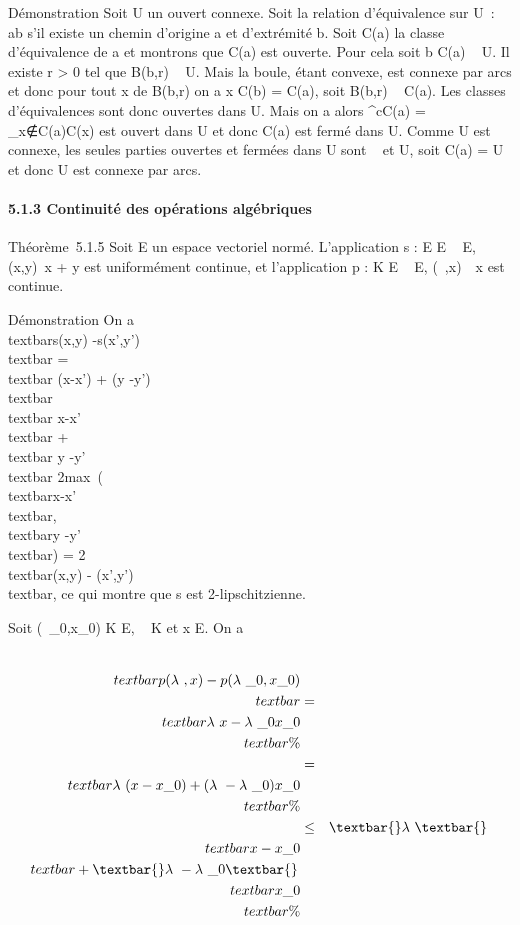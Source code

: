 \documentclass[]{article}
\begin{document}
Démonstration Soit U un ouvert connexe. Soit  la relation d'équivalence
sur U~: ab s'il existe un chemin d'origine a et d'extrémité b. Soit
C(a) la classe d'équivalence de a et montrons que C(a) est ouverte. Pour
cela soit b \in C(a) \subset~ U. Il existe r \textgreater{} 0 tel que B(b,r) \subset~ U.
Mais la boule, étant convexe, est connexe par arcs et donc pour tout x
de B(b,r) on a x \in C(b) = C(a), soit B(b,r) \subset~ C(a). Les classes
d'équivalences sont donc ouvertes dans U. Mais on a alors
^cC(a) =\ \⋃
 \_x∉C(a)C(x) est ouvert dans U et
donc C(a) est fermé dans U. Comme U est connexe, les seules parties
ouvertes et fermées dans U sont \varnothing~ et U, soit C(a) = U et donc U est
connexe par arcs.

\paragraph{5.1.3 Continuité des opérations algébriques}

Théorème~5.1.5 Soit E un espace vectoriel normé. L'application s : E \times E
\rightarrow~ E, (x,y)\mapsto~x + y est uniformément continue,
et l'application p : K \times E \rightarrow~ E, (\lambda~,x)\mapsto~\lambda~x est
continue.

Démonstration On a \\textbar{}s(x,y)
-s(x',y')\\textbar{} =\\textbar{} (x-x') +
(y -y')\\textbar{} \leq\\textbar{}
x-x'\\textbar{} +\\textbar{} y
-y'\\textbar{} \leq
2max~(\\textbar{}x-x'\\textbar{},\\textbar{}y
-y'\\textbar{}) = 2\\textbar{}(x,y) -
(x',y')\\textbar{}, ce qui montre que s est
2-lipschitzienne.

Soit (\lambda~\_0,x\_0) \in K \times E, \lambda~ \in K et x \in E. On a

\begin{align*} \\textbar{}p(\lambda~,x) -
p(\lambda~\_0,x\_0)\\textbar{}& =&
\\textbar{}\lambda~x -
\lambda~\_0x\_0\\textbar{} \%&
\\ & =& \\textbar{}\lambda~(x -
x\_0) + (\lambda~ -
\lambda~\_0)x\_0\\textbar{}\%&
\\ & \leq&
\textbar{}\lambda~\textbar{}\,\\textbar{}x -
x\_0\\textbar{} + \textbar{}\lambda~ -
\lambda~\_0\textbar{}\,\\textbar{}x\_0\\textbar{}
\%& \\ \end{align*}
\end{document}
